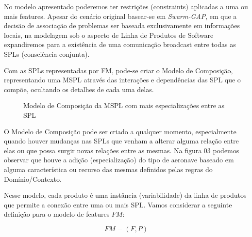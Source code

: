 \documentclass[12pt,oneside, a4paper]{article}
\begin{document}
No modelo apresentado poderemos ter restrições (constraints) aplicadas a uma ou mais features. Apesar do cenário original basear-se em \textit{Swarm-GAP}, em que a decisão de associação de problemas ser baseada exclusivamente em informações locais, na modelagem sob o aspecto de Linha de Produtos de Software expandiremos para a existência de uma comunicação broadcast entre todas as SPLs (consciência conjunta).

Com as SPLs representadas por FM, pode-se criar o Modelo de Composição, representando uma MSPL através das interações e dependências das SPL que o compõe, ocultando os detalhes de cada uma delas.

\begin{figure}[!htb]
\centering
{}
\caption{Modelo de Composição da MSPL com mais especializações entre as SPL}
\label{figure 03}
\end{figure}

O Modelo de Composição pode ser criado a qualquer momento, especialmente quando houver mudanças nas SPLs que venham a alterar alguma relação entre elas ou que possa surgir novas relações entre as mesmas. Na figura 03 podemos observar que houve a adição (especialização) do tipo de aeronave baseado em alguma característica ou recurso das mesmas definidos pelas regras do Domínio/Contexto.

Nesse modelo, cada produto é uma instância (variabilidade) da linha de produtos que permite a conexão entre uma ou mais SPL. Vamos considerar a seguinte definição para o modelo de features $ FM $:

\begin{equation}
FM = (F,P)
\end{equation}
\end{document}
